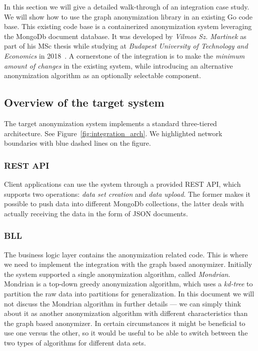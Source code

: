 In this section we will give a detailed walk-through of an integration case study. We will show how to use the graph anonymization library in an existing Go code base. This existing code base is a containerized anonymization system leveraging the MongoDb document database. It was developed by \emph{Vilmos Sz. Martinek} as part of his MSc thesis while studying at \textit{Budapest University of Technology and Economics} in 2018~\cite{martinek}. A cornerstone of the integration is to make the \emph{minimum amount of changes} in the existing system, while introducing an alternative anonymization algorithm as an optionally selectable component.

\subsection{Overview of the target system}

The target anonymization system implements a standard three-tiered architecture. See Figure~\ref{fig:integration_arch}. We highlighted network boundaries with blue dashed lines on the figure.

\subsubsection{REST API}\label{subsubsec:rest_api}
Client applications can use the system through a provided REST API, which supports two operations: \emph{data set creation} and \emph{data upload}. The former makes it possible to push data into different MongoDb collections, the latter deals with actually receiving the data in the form of JSON documents.

\vspace{\baselineskip}


\subsubsection{BLL}
The business logic layer contains the anonymization related code. This is where we need to implement the integration with the graph based anonymizer. Initially the system supported a single anonymization algorithm, called \emph{Mondrian}. Mondrian is a top-down greedy anonymization algorithm, which uses a \emph{kd-tree} to partition the raw data into partitions for generalization. In this document we will not discuss the Mondrian algorithm in further details --- we can simply think about it as another anonymization algorithm with different characteristics than the graph based anonymizer. In certain circumstances it might be beneficial to use one versus the other, so it would be useful to be able to switch between the two types of algorithms for different data sets.

